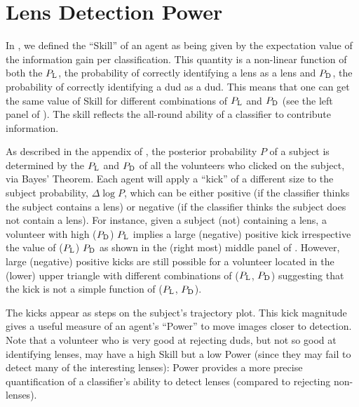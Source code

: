 \documentclass[useAMS,usenatbib,a4paper]{mn2e}
\begin{document}
\section{Lens Detection Power}
\label{appendix:power}

In \PaperOne, we defined the ``Skill'' of an agent as being given by the
expectation value of the information gain per classification. This
quantity is a non-linear function of both the $P_{\rm L}$, the
probability of correctly identifying a lens as a lens and $P_{\rm D}$,
the probability of correctly identifying a dud as a dud. This means that
one can get the same value of Skill for different combinations of
$P_{\rm L}$ and $P_{\rm D}$ (see the left panel of
). The skill reflects the all-round ability of a
classifier to contribute information.

As described in the appendix of \PaperOne, the posterior probability $P$
of a subject is determined by the $P_{\rm L}$ and $P_{\rm D}$ of all the
volunteers who clicked on the subject, via Bayes' Theorem. Each agent
will apply a ``kick'' of a different size to the subject probability,
$\Delta\log{P}$, which can be either positive (if the classifier thinks
the subject contains a lens) or negative (if the classifier thinks the
subject does not contain a lens). For instance, given a subject
(not) containing a lens, a volunteer with high ($P_{\rm D}$) $P_{\rm L}$
implies a large (negative) positive kick irrespective the value of
($P_{\rm L}$) $P_{\rm D}$ as shown in the (right most) middle panel of
. However, large (negative) positive kicks are
still possible for a volunteer located in the (lower) upper triangle
with different combinations of ($P_{\rm L}$, $P_{\rm D}$) suggesting that
the kick is not a simple function of ($P_{\rm L}$, $P_{\rm D}$).

The kicks appear as steps on the subject's trajectory plot. This kick
magnitude gives a useful measure of an agent's ``Power'' to move
images closer to detection.  Note that a volunteer who is very good at
rejecting duds, but not so good at identifying lenses, may have a high
Skill but a low Power (since they may fail to detect many of the
interesting lenses): Power provides a more precise quantification of a
classifier's ability to detect lenses (compared to rejecting non-lenses).
\end{document}
